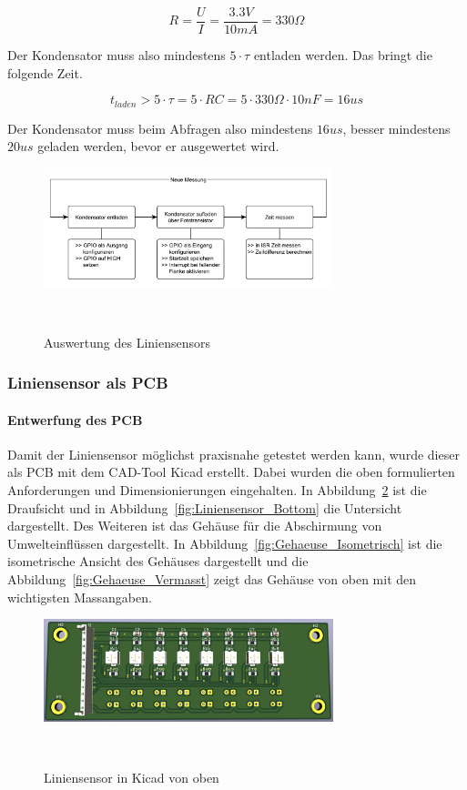 \documentclass{article}
\begin{document}
\[
    R = \frac{U}{I} = \frac{3.3V}{10mA} = 330 \Omega
\]

Der Kondensator muss also mindestens $5 \cdot \tau$ entladen werden. Das bringt
die folgende Zeit.

\[
    t_{laden} > 5 \cdot \tau = 5 \cdot RC = 5 \cdot 330 \Omega \cdot 10nF = 16us
\]

Der Kondensator muss beim Abfragen also mindestens $16us$, besser mindestens
$20 us$ geladen werden, bevor er ausgewertet wird.

\begin{figure}[H]
    \centering
    \includegraphics[width=0.75\textwidth]{Auswertung.pdf}
    \caption{Auswertung des Liniensensors}~\label{fig:Auswertung_Liniensensor}
\end{figure}


\subsubsection{Liniensensor als PCB}
\paragraph{Entwerfung des PCB}Damit der Liniensensor möglichst praxisnahe getestet 
werden kann, wurde dieser als PCB mit dem CAD-Tool Kicad erstellt. Dabei wurden die 
oben formulierten Anforderungen und Dimensionierungen eingehalten. In Abbildung~\ref{fig:Liniensensor_Top} 
ist die Draufsicht und in Abbildung~\ref{fig:Liniensensor_Bottom} die Untersicht dargestellt. Des Weiteren ist 
das Gehäuse für die Abschirmung von Umwelteinflüssen dargestellt. In Abbildung~\ref{fig:Gehaeuse_Isometrisch} 
ist die isometrische Ansicht des Gehäuses dargestellt und die Abbildung~\ref{fig:Gehaeuse_Vermasst} zeigt das 
Gehäuse von oben mit den wichtigsten Massangaben.

\begin{figure}[H]
    \centering
    \includegraphics[width=0.75\textwidth]{Liniensensor_Top.pdf}
    \caption{Liniensensor in Kicad von oben}~\label{fig:Liniensensor_Top}
\end{figure}
\end{document}
